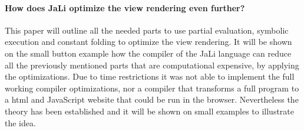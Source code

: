 \paragraph{How does JaLi optimize the view rendering even further?} This paper will outline all the needed parts to use partial evaluation, symbolic execution and constant folding to optimize the view rendering. It will be shown on the small button example how the compiler of the JaLi language can reduce all the previously mentioned parts that are computational expensive, by applying the optimizations.
Due to time restrictions it was not able to implement the full working compiler optimizations, nor a compiler that transforms a full program to a \gls{html} and JavaScript website that could be run in the browser. Nevertheless the theory has been established and it will be shown on small examples to illustrate the idea.
